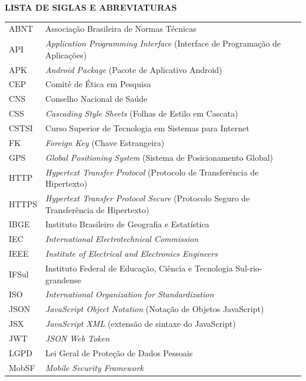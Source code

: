 \thispagestyle{empty}
\begin{center}
    \textbf{\large LISTA DE SIGLAS E ABREVIATURAS}
\end{center}
\vspace{0.8cm}

\begin{singlespacing}
\noindent
\begin{longtable}{p{3.5cm} p{11.5cm}}
ABNT & Associação Brasileira de Normas Técnicas \\
API & \textit{Application Programming Interface} (Interface de Programação de Aplicações) \\
APK & \textit{Android Package} (Pacote de Aplicativo Android) \\
CEP & Comitê de Ética em Pesquisa \\
CNS & Conselho Nacional de Saúde \\
CSS & \textit{Cascading Style Sheets} (Folhas de Estilo em Cascata) \\
CSTSI & Curso Superior de Tecnologia em Sistemas para Internet \\
FK & \textit{Foreign Key} (Chave Estrangeira) \\
GPS & \textit{Global Positioning System} (Sistema de Posicionamento Global) \\
HTTP & \textit{Hypertext Transfer Protocol} (Protocolo de Transferência de Hipertexto) \\
HTTPS & \textit{Hypertext Transfer Protocol Secure} (Protocolo Seguro de Transferência de Hipertexto) \\
IBGE & Instituto Brasileiro de Geografia e Estatística \\
IEC & \textit{International Electrotechnical Commission} \\
IEEE & \textit{Institute of Electrical and Electronics Engineers} \\
IFSul & Instituto Federal de Educação, Ciência e Tecnologia Sul-rio-grandense \\
ISO & \textit{International Organization for Standardization} \\
JSON & \textit{JavaScript Object Notation} (Notação de Objetos JavaScript) \\
JSX & \textit{JavaScript XML} (extensão de sintaxe do JavaScript) \\
JWT & \textit{JSON Web Token} \\
LGPD & Lei Geral de Proteção de Dados Pessoais \\
MobSF & \textit{Mobile Security Framework} \\

\end{longtable}
\end{singlespacing}
